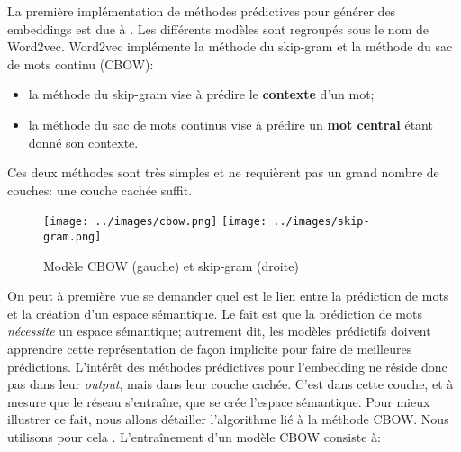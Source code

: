 \documentclass[french]{article}
\begin{document}
				La première implémentation de méthodes prédictives pour générer des embeddings est due à \cite{mikolov2013}. Les différents modèles sont regroupés sous le nom de Word2vec. Word2vec implémente la méthode du skip-gram et la méthode du sac de mots continu (CBOW):
				\begin{itemize}
					\item la méthode du skip-gram vise à prédire le \textbf{contexte} d'un mot;
					\item la méthode du sac de mots continus vise à prédire un \textbf{mot central} étant donné son contexte.
				\end{itemize}
				Ces deux méthodes sont très simples et ne requièrent pas un grand nombre de couches: une couche cachée suffit.	
				\begin{figure}[H]
					\centering
					\texttt{[image: ../images/cbow.png]}
					\texttt{[image: ../images/skip-gram.png]}
					\caption{Modèle CBOW (gauche) et skip-gram (droite)}
				\end{figure}
				On peut à première vue se demander quel est le lien entre la prédiction de mots et la création d'un espace sémantique. Le fait est que la prédiction de mots \textit{nécessite} un espace sémantique; autrement dit, les modèles prédictifs doivent apprendre cette représentation de façon implicite pour faire de meilleures prédictions. L'intérêt des méthodes prédictives pour l'embedding ne réside donc pas dans leur \textit{output}, mais dans leur couche cachée. C'est dans cette couche, et à mesure que le réseau s'entraîne, que se crée l'espace sémantique. Pour mieux illustrer ce fait, nous allons détailler l'algorithme lié à la méthode CBOW. Nous utilisons pour cela \cite{socher2016}. L'entraînement d'un modèle CBOW consiste à:
\end{document}
